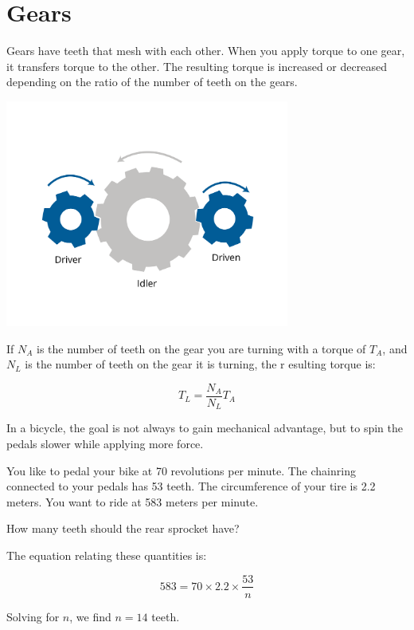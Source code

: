 \section{Gears}

Gears have teeth that mesh with each other. When you apply torque to one gear, 
it transfers torque to the other. The resulting torque is increased or decreased 
depending on the ratio of the number of teeth on the gears. 

\includegraphics[width=0.7\textwidth]{gearsNew.png}

If \( N_A \) is the number of teeth on the gear you are turning with a torque of 
\( T_A \), and \( N_L \) is the number of teeth on the gear it is turning, the r
esulting torque is:

\[
T_L = \frac{N_A}{N_L} T_A
\]
\begin{Exercise}[title={Gears}, label=gear]
In a bicycle, the goal is not always to gain mechanical advantage, but to spin 
the pedals slower while applying more force.

You like to pedal your bike at 70 revolutions per minute. The chainring 
connected to your pedals has 53 teeth. The circumference of your tire is 2.2 
meters. You want to ride at 583 meters per minute.

How many teeth should the rear sprocket have?
\end{Exercise}
\begin{Answer}[ref=gear]
The equation relating these quantities is:

\[
583 = 70 \times 2.2 \times \frac{53}{n}
\]

Solving for \( n \), we find \( n = 14 \) teeth.
\end{Answer}

